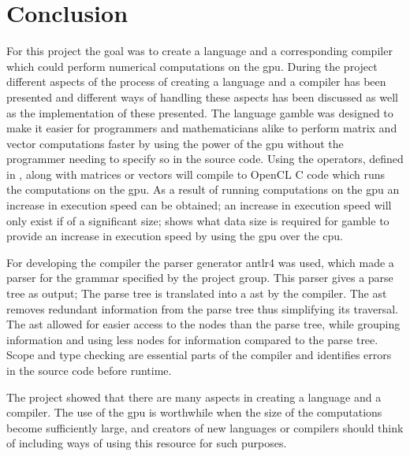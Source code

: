 \chapter{Conclusion} %
\label{cha:conclusion}
For this project the goal was to create a language and a corresponding compiler which could perform numerical computations on the \acrshort{gpu}.
During the project different aspects of the process of creating a language and a compiler has been presented and different ways of handling these aspects has been discussed as well as the implementation of these presented.
The language \gls{gamble} was designed to make it easier for programmers and mathematicians alike to perform matrix and vector computations faster by using the power of the \acrshort{gpu} without the programmer needing to specify so in the source code.
Using the operators, defined in , along with matrices or vectors will compile to OpenCL C code which runs the computations on the \acrshort{gpu}.
As a result of running computations on the \acrshort{gpu} an increase in execution speed can be obtained; an increase in execution speed will only exist if of a significant size;  shows what data size is required for \gls{gamble} to provide an increase in execution speed by using the \acrshort{gpu} over the \acrshort{cpu}.

For developing the compiler the parser generator \acrshort{antlr}4 was used, which made a parser for the grammar specified by the project group.
This parser gives a parse tree as output; The parse tree is translated into a \acrshort{ast} by the compiler.
The \acrshort{ast} removes redundant information from the parse tree thus simplifying its traversal.
The \acrshort{ast} allowed for easier access to the nodes than the parse tree, while grouping information and using less nodes for information compared to the parse tree.
Scope and type checking are essential parts of the compiler and identifies errors in the source code before runtime.

The project showed that there are many aspects in creating a language and a compiler.
The use of the \acrshort{gpu} is worthwhile when the size of the computations become sufficiently large, and creators of new languages or compilers should think of including ways of using this resource for such purposes.